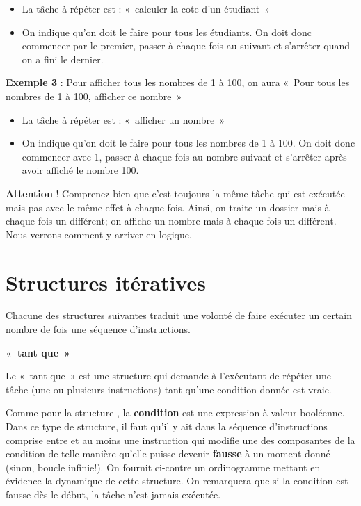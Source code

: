 	\begin{itemize}
	\item 
		La tâche à répéter est : «~calculer la cote d'un
		étudiant~»
	\item 
		On indique qu'on doit le faire pour tous les étudiants.
		On doit donc commencer par le premier, passer à chaque fois au suivant
		et s'arrêter quand on a fini le dernier.
	\end{itemize}

	\textbf{Exemple 3} : Pour afficher tous les nombres de 1 à 100, on aura
	«~Pour tous les nombres de 1 à 100, afficher ce nombre~»

	\begin{itemize}
	\item
		La tâche à répéter est : «~afficher un nombre~»
	\item 
		On indique qu'on doit le faire pour tous les nombres de
		1 à 100. On doit donc commencer avec 1, passer à chaque fois au nombre
		suivant et s'arrêter après avoir affiché le nombre
		100.
	\end{itemize}

	\textbf{Attention} ! Comprenez bien que c'est toujours
	la même tâche qui est exécutée mais pas avec le même effet à chaque
	fois. Ainsi, on traite un dossier mais à chaque fois un différent; on
	affiche un nombre mais à chaque fois un différent. Nous verrons comment
	y arriver en logique.

\section{Structures itératives}

Chacune des structures suivantes traduit une volonté de faire exécuter
un certain nombre de fois une séquence d’instructions. 

{\sffamily\bfseries
«~tant que~»}

{
Le «~tant que~» est une structure qui demande à
l'exécutant de répéter une tâche (une ou plusieurs
instructions) tant qu'une condition donnée est vraie.}


\bigskip

{
Comme pour la structure , la \textbf{condition} est
une expression à valeur booléenne. Dans ce type de structure, il faut
qu’il y ait dans la séquence d’instructions comprise entre
 et  au moins une
instruction qui modifie une des composantes de la condition de telle
manière qu’elle puisse devenir \textbf{fausse} à un moment donné
(sinon, boucle infinie!). On fournit ci-contre un ordinogramme mettant
en évidence la dynamique de cette structure. On remarquera que si la
condition est fausse dès le début, la tâche n'est
jamais exécutée.}

